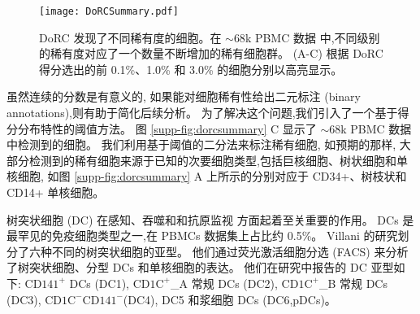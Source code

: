 \begin{figure*}[!htbp]
    \centering
    \texttt{[image: DoRCSummary.pdf]}
    \caption{
    DoRC 发现了不同稀有度的细胞。在 ${\sim}68$k PBMC 数据 \cite{zheng2017massively} 中,不同级别的稀有度对应了一个数量不断增加的稀有细胞群。
    (A-C) 根据 DoRC 得分选出的前 0.1\%、1.0\% 和 3.0\% 的细胞分别以高亮显示。    
    }
    \label{fig:dorcsummary}
\end{figure*}

虽然连续的分数是有意义的,
如果能对细胞稀有性给出二元标注 (binary annotations),则有助于简化后续分析。
为了解决这个问题,我们引入了一个基于得分分布特性的阈值方法。
图 \ref{supp-fig:dorcsummary} C 显示了 ${\sim}68$k PBMC 数据中检测到的细胞。
我们利用基于阈值的二分法来标注稀有细胞,
如预期的那样,
大部分检测到的稀有细胞来源于已知的次要细胞类型,包括巨核细胞、树状细胞和单核细胞,
如图 \ref{supp-fig:dorcsummary} A 上所示的分别对应于 CD34+、树枝状和 CD14+ 单核细胞。



树突状细胞 (DC) 在感知、吞噬和和抗原监视 \cite{villani2017single} 方面起着至关重要的作用。
DCs 是最罕见的免疫细胞类型之一,在 PBMCs \cite{zheng2017massively} 数据集上占比约 0.5\%。
Villani \cite{villani2017single} 的研究划分了六种不同的树突状细胞的亚型。
他们通过荧光激活细胞分选 (FACS) 来分析了树突状细胞、分型 DCs 和单核细胞的表达。
他们在研究中报告的 DC 亚型如下:
$\text{CD141}^+$ DCs (DC1), 
$\text{CD1C}^+${\_}A 常规 DCs (DC2),
$\text{CD1C}^+${\_}B 常规 DCs (DC3),
$\text{CD1C}^-\text{CD141}^-$(DC4), DC5 和浆细胞 DCs (DC6,pDCs)。

